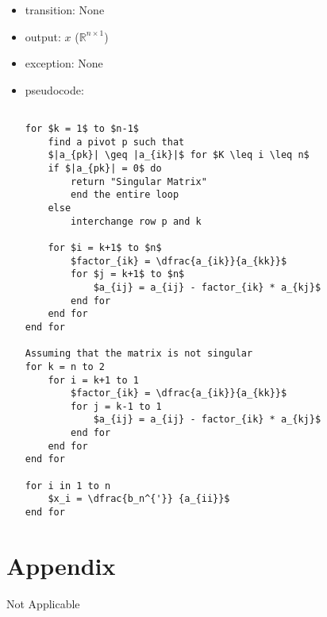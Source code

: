 \documentclass[12pt, titlepage]{article}
\begin{document}
\noindent %
\begin{itemize}
\item transition: None%
\item output: $x$ ($\mathbb{R}^{n \times 1}$)
\item exception: None%
\item pseudocode:
\begin{lstlisting}[mathescape=true]

for $k = 1$ to $n-1$
    find a pivot p such that
    $|a_{pk}| \geq |a_{ik}|$ for $K \leq i \leq n$
    if $|a_{pk}| = 0$ do
        return "Singular Matrix"
        end the entire loop
    else 
        interchange row p and k
        
    for $i = k+1$ to $n$
        $factor_{ik} = \dfrac{a_{ik}}{a_{kk}}$
        for $j = k+1$ to $n$
            $a_{ij} = a_{ij} - factor_{ik} * a_{kj}$
        end for
    end for
end for

Assuming that the matrix is not singular
for k = n to 2
    for i = k+1 to 1
        $factor_{ik} = \dfrac{a_{ik}}{a_{kk}}$
        for j = k-1 to 1
            $a_{ij} = a_{ij} - factor_{ik} * a_{kj}$
        end for
    end for
end for

for i in 1 to n
    $x_i = \dfrac{b_n^{'}} {a_{ii}}$
end for

\end{lstlisting}
\end{itemize}


\newpage




\newpage

\section{Appendix} \label{Appendix}
Not Applicable

\end{document}
